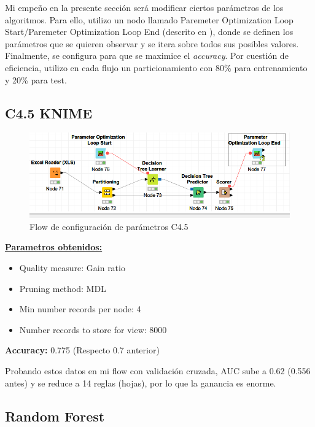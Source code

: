 Mi empeño en la presente sección será modificar ciertos parámetros de los algoritmos. Para ello, utilizo un nodo llamado Paremeter Optimization Loop Start/Paremeter Optimization Loop End (descrito en \cite{param-opt}), donde se definen los parámetros que se quieren observar y se itera sobre todos sus posibles valores. Finalmente, se configura para que se maximice el \textit{accuracy}. Por cuestión de eficiencia, utilizo en cada flujo un particionamiento con 80\% para entrenamiento y 20\% para test.

\subsection{C4.5 KNIME}

\begin{figure}[H] %
	\centering
	\includegraphics[scale=0.38]{flow-param-c45.png}  %
	\caption{Flow de configuración de parámetros C4.5} 
	\label{fig:conf-c45}
\end{figure}


\underline{\textbf{Parametros obtenidos:}} \\
\begin{itemize}
	\item Quality measure: Gain ratio
	\item Pruning method: MDL
	\item Min number records per node: 4 
	\item Number records to store for view: 8000
\end{itemize}
\textbf{Accuracy:} 0.775 (Respecto 0.7 anterior)

Probando estos datos en mi flow con validación cruzada, AUC sube a 0.62 (0.556 antes) y se reduce a 14 reglas (hojas), por lo que la ganancia es enorme.

\subsection{Random Forest}

